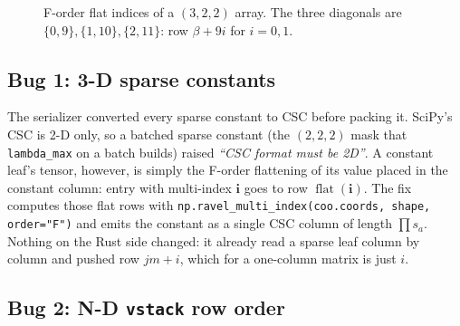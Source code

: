 \documentclass[11pt,a4paper]{article}
\newcommand{\code}[1]{\texttt{#1}}
\begin{document}
\begin{figure}[H]
\centering
{}
\caption{F-order flat indices of a $(3,2,2)$ array. The three diagonals are $\{0,9\},\{1,10\},\{2,11\}$:
row $\beta + 9i$ for $i=0,1$.}
\label{fig:forder}
\end{figure}

\subsection{Bug 1: 3-D sparse constants}

The serializer converted every sparse constant to CSC before packing it. SciPy's CSC is 2-D only, so a
batched sparse constant (the $(2,2,2)$ mask that \code{lambda\_max} on a batch builds) raised
\emph{``CSC format must be 2D''}. A constant leaf's tensor, however, is simply the F-order flattening of
its value placed in the constant column: entry with multi-index $\mathbf{i}$ goes to row
$\operatorname{flat}(\mathbf{i})$. The fix computes those flat rows with
\code{np.ravel\_multi\_index(coo.coords, shape, order="F")} and emits the constant as a single CSC
column of length $\prod s_a$. Nothing on the Rust side changed: it already read a sparse leaf column by
column and pushed row $jm+i$, which for a one-column matrix is just $i$.

\subsection{Bug 2: N-D \code{vstack} row order}
\end{document}
